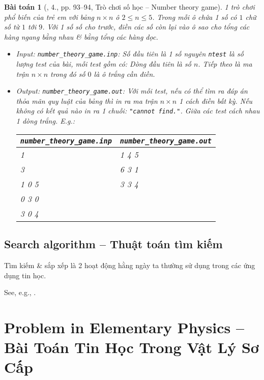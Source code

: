 \documentclass{article}
\newtheorem{baitoan}{Bài toán}
\begin{document}
\begin{baitoan}[\cite{VietSTEM2021}, 4., pp. 93--94, Trò chơi số học -- Number theory game]
	1 trò chơi phổ biến của trẻ em với bảng $n\times n$ ô $2\le n\le5$. Trong mỗi ô chứa 1 số có $1$ chữ số từ $1$ tới $9$. Với 1 số số cho trước, điền các số còn lại vào ô sao cho tổng các hàng ngang bằng nhau \& bằng tổng các hàng dọc.
	\begin{itemize}
		\item {\sf Input:} \verb|number_theory_game.inp|: Số đầu tiên là 1 số nguyên \texttt{ntest} là số lượng test của bài, mỗi test gồm có: Dòng đầu tiên là số $n$. Tiếp theo là ma trận $n\times n$ trong đó số $0$ là ô trắng cần điền.		
		\item {\sf Output:} \verb|number_theory_game.out|: Với mỗi test, nếu có thể tìm ra đáp án thỏa mãn quy luật của bảng thì in ra ma trận $n\times n$ 1 cách điền bất kỳ. Nếu không có kết quả nào in ra 1 chuỗi: \texttt{"cannot find."}. Giữa các test cách nhau 1 dòng trắng. E.g.:
		\begin{table}[H]
			\centering
			\begin{tabular}{|l|l|}
				\hline
				\verb|number_theory_game.inp| & \verb|number_theory_game.out| \\
				\hline
				1 & 1 4 5 \\
				3 & 6 3 1 \\
				1 0 5 & 3 3 4 \\
				0 3 0 & \\
				3 0 4 & \\
				\hline
			\end{tabular}
		\end{table}		
	\end{itemize}
\end{baitoan}
	

\subsection{Search algorithm -- Thuật toán tìm kiếm}
Tìm kiếm \& sắp xếp là 2 hoạt động hằng ngày ta thường sử dụng trong các ứng dụng tin học.

See, e.g., \cite[Chap. 6: Searching]{Knuth1998}.


\section{Problem in Elementary Physics -- Bài Toán Tin Học Trong Vật Lý Sơ Cấp}
\end{document}
